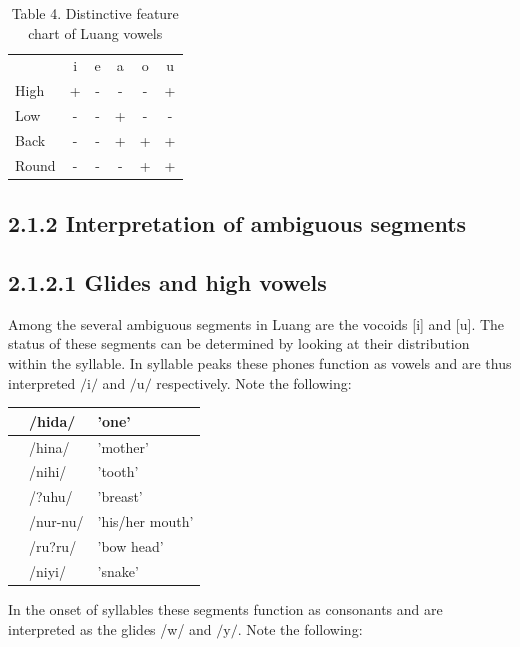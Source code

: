 \documentclass[10pt]{article}
\begin{document}
\begin{table}[h]
\begin{center}
\captionsetup{labelformat=empty}
\caption{Table 4. Distinctive feature chart of Luang vowels}
\begin{tabular}{|lccccc|}
\hline
 & i & e & a & o & u \\
High & + & - & - & - & + \\
Low & - & - & + & - & - \\
Back & - & - & + & + & + \\
Round & - & - & - & + & + \\
\hline
\end{tabular}
\end{center}
\end{table}

\subsection*{2.1.2 Interpretation of ambiguous segments}
\subsection*{2.1.2.1 Glides and high vowels}
Among the several ambiguous segments in Luang are the vocoids [i] and [u]. The status of these segments can be determined by looking at their distribution within the syllable. In syllable peaks these phones function as vowels and are thus interpreted \(/ \mathrm{i} /\) and \(/ \mathrm{u} /\) respectively. Note the following:

\begin{center}
\begin{tabular}{|l|l|l|}
\hline
['?ida] & /hida/ & 'one' \\
\hline
['rinə] & /hina/ & 'mother' \\
\hline
['nihi] & /nihi/ & 'tooth' \\
\hline
['?uhu] & /?uhu/ & 'breast' \\
\hline
['nurnu] & /nur-nu/ & 'his/her mouth' \\
\hline
['ru?ru] & /ru?ru/ & 'bow head' \\
\hline
['niyi] & /niyi/ & 'snake' \\
\hline
\end{tabular}
\end{center}

In the onset of syllables these segments function as consonants and are interpreted as the glides /w/ and \(/ \mathrm{y} /\). Note the following:
\end{document}
